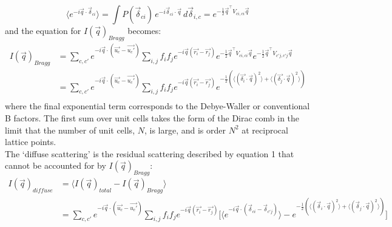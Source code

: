\documentclass{article}
\begin{document}
\begin{equation}
\langle e^{-i {\vec{q}} \cdot \vec{\delta}_{ci} } \rangle = \int P(\vec{\delta}_{ci})\, e^{-i \vec{\delta}_{ci} \cdot {\vec{q}}} \, d\vec{\delta}_{i,c} = e^{-\frac{1}{2} \vec{q}^\intercal V_{ci,ci} \vec{q} }
\end{equation}
and the equation for $I(\vec{q})_{Bragg}$ becomes:
\begin{equation}
\begin{aligned}
I(\vec{q})_{Bragg} & = \sum\limits_{c,c'} e^{-i \vec{q} \cdot (\vec{u_c} - \vec{u_c'})} \sum\limits_{i,j} f_i f_j e^{-i \vec{q} (\vec{r_i} - \vec{r_j})} e^{-\frac{1}{2} \vec{q}^\intercal V_{ci,ci} \vec{q}} e^{-\frac{1}{2} \vec{q}^\intercal V_{c'j,c'j} \vec{q}} \\
& = \sum\limits_{c,c'} e^{-i \vec{q} \cdot (\vec{u_c} - \vec{u_c'})} \sum\limits_{i,j} f_i f_j e^{-i \vec{q} (\vec{r_i} - \vec{r_j})} e^{-\frac{1}{2} (\langle (\vec{\delta_i} \cdot \vec{q})^2 \rangle + \langle (\vec{\delta_j} \cdot \vec{q})^2 \rangle) } \\
\end{aligned}
\end{equation}
where the final exponential term corresponds to the Debye-Waller or conventional B factors. The first sum over unit cells takes the form of the Dirac comb in the limit that the number of unit cells, $N$, is large, and is order $N^2$ at reciprocal lattice points. 
\newline
{}
\\
The `diffuse scattering' is the residual scattering described by equation 1 that cannot be accounted for by $I(\vec{q})_{Bragg}$:
\begin{equation}
\begin{aligned}
I(\vec{q})_{diffuse} & = \langle I(\vec{q})_{total} - I(\vec{q})_{Bragg} \rangle \\
& = \sum\limits_{c,c'} e^{-i \vec{q} \cdot (\vec{u_c} - \vec{u_c'})} \sum\limits_{i,j} f_i f_j e^{-i \vec{q} (\vec{r_i} - \vec{r_j})} \lbrack \langle e^{ -i \vec{q} \cdot (\vec{\delta}_{ci} - \vec{\delta}_{c'j} )} \rangle -  e^{-\frac{1}{2} (\langle (\vec{\delta}_i \cdot \vec{q})^2 \rangle + \langle (\vec{\delta}_j \cdot \vec{q})^2 \rangle) } \rbrack \\
\end{aligned}
\end{equation}
\end{document}
